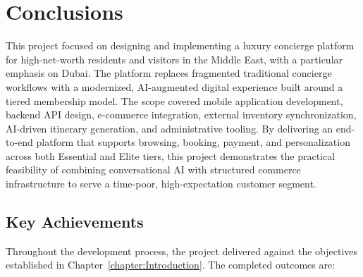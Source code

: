 \chapter{Conclusions}
This project focused on designing and implementing a luxury concierge platform for high-net-worth residents and visitors in the Middle East, with a particular emphasis on Dubai. The platform replaces fragmented traditional concierge workflows with a modernized, AI-augmented digital experience built around a tiered membership model. The scope covered mobile application development, backend API design, e-commerce integration, external inventory synchronization, AI-driven itinerary generation, and administrative tooling. By delivering an end-to-end platform that supports browsing, booking, payment, and personalization across both Essential and Elite tiers, this project demonstrates the practical feasibility of combining conversational AI with structured commerce infrastructure to serve a time-poor, high-expectation customer segment.

\section{Key Achievements}

Throughout the development process, the project delivered against the objectives established in Chapter~\ref{chapter:Introduction}. The completed outcomes are:

